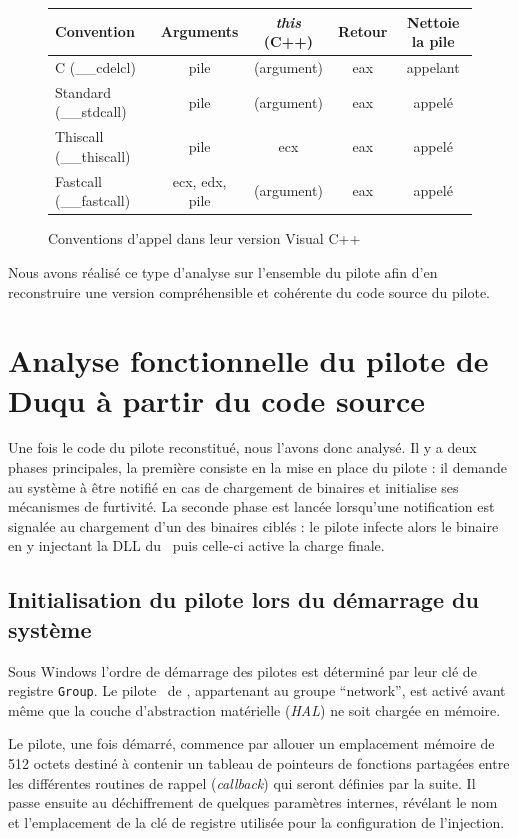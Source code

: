 \begin{figure}[h]
\begin{center}
\begin{tabular}{|l|c|c|c|c|}
\hline 
Convention & Arguments & \emph{this} (C++) & Retour & Nettoie la pile\\
\hline
C (\_\_cdelcl) & pile & (argument) & eax & appelant\\
Standard (\_\_stdcall) & pile & (argument) & eax & appelé\\
Thiscall (\_\_thiscall) & pile & ecx & eax & appelé\\
Fastcall (\_\_fastcall) & ecx, edx, pile & (argument) & eax & appelé\\
\hline
\end{tabular}
\end{center}
\caption{Conventions d'appel dans leur version Visual C++}
\label{fig:callingconvention}
\end{figure}

Nous avons réalisé ce type d'analyse sur l'ensemble du pilote afin d'en reconstruire une version compréhensible et cohérente du code source du pilote.

\section{Analyse fonctionnelle du pilote de Duqu à partir du code source}
Une fois le code du pilote reconstitué, nous l'avons donc analysé.
Il y a deux phases principales, la première consiste en la mise en place du pilote : il demande au système à être notifié en cas de chargement de binaires et initialise ses mécanismes de furtivité.
La seconde phase est lancée lorsqu'une notification est signalée au chargement d'un des binaires ciblés : le pilote infecte alors le binaire en y injectant la DLL du \duqu\ puis celle-ci active la charge finale.

\subsection{Initialisation du pilote lors du démarrage du système}
Sous Windows l'ordre de démarrage des pilotes est déterminé par leur clé de registre \texttt{Group}.
Le pilote \driver\ de \duqu, appartenant au groupe ``network'', est activé avant même que la couche d'abstraction matérielle (\emph{HAL}) ne soit chargée en mémoire.

Le pilote, une fois démarré, commence par allouer un emplacement mémoire de 512 octets destiné à contenir un tableau de pointeurs de fonctions partagées entre les différentes routines de rappel (\emph{callback}) qui seront définies par la suite.
Il passe ensuite au déchiffrement de quelques paramètres internes, révélant le nom et l'emplacement de la clé de registre utilisée pour la configuration de l'injection.

